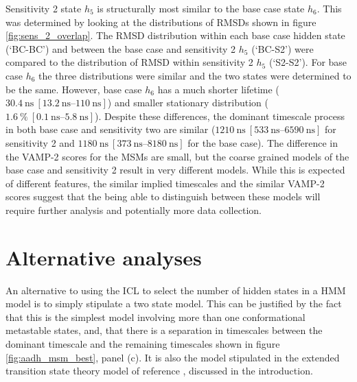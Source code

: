 Sensitivity 2 state $h_{5}$ is structurally most similar to the base case state $h_{6}$. This was determined by looking at the distributions of RMSDs shown in figure \ref{fig:sens_2_overlap}. The RMSD distribution within each base case hidden state (`BC-BC') and between the base case and sensitivity 2 $h_{5}$ (`BC-S2') were compared to the distribution of RMSD within sensitivity 2 $h_{5}$ (`S2-S2'). For base case $h_{6}$ the three distributions were similar and the two states were determined to be the same.  However, base case $h_{6}$ has a much shorter lifetime ($\SI{30.4}{\nano\second}\ [\SIrange[range-phrase=\text{--}]{13.2}{110}{\nano\second}]$) and smaller stationary distribution ($\SI{1.6}{\percent}\ [\SIrange[range-phrase=\text{--}]{0.1}{5.8}{\nano\second}]$). Despite these differences, the dominant timescale process in both base case and sensitivity two are similar ($\SI{1210}{\nano\second}\ [\SIrange[range-phrase=\text{--}]{533}{6590}{\nano\second}]$ for sensitivity 2 and  $\SI{1180}{\nano\second}\ [\SIrange[range-phrase=\text{--}]{373}{8180}{\nano\second}]$ for the base case). The difference in the VAMP-2 scores for the MSMs are small, but the coarse grained models of the base case and sensitivity 2 result in very different models. While this is expected of different features, the similar implied timescales  and the similar VAMP-2 scores suggest that the being able to distinguish between these models will require further analysis and potentially more data collection. 


\section{Alternative analyses}\label{sec:outlook}

An alternative to using the ICL to select the number of hidden states in a HMM model is to simply stipulate a two state model. This can be justified by the fact that this is the simplest model involving more than one conformational metastable states, and, that there is a separation in timescales between the dominant timescale and the remaining timescales shown in figure \ref{fig:aadh_msm_best}, panel (c). It is also the model stipulated in the extended transition state theory model of reference \cite{glowackiProteinDynamicsEnzyme2012, glowackiTakingOckhamRazor2012b}, discussed in the introduction. 

